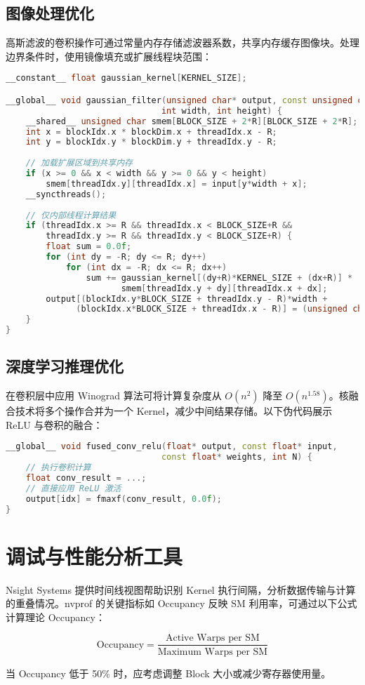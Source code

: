 \section{图像处理优化}
高斯滤波的卷积操作可通过常量内存存储滤波器系数，共享内存缓存图像块。处理边界条件时，使用镜像填充或扩展线程块范围：\par
\begin{lstlisting}[language=cpp]
__constant__ float gaussian_kernel[KERNEL_SIZE];

__global__ void gaussian_filter(unsigned char* output, const unsigned char* input, 
                               int width, int height) {
    __shared__ unsigned char smem[BLOCK_SIZE + 2*R][BLOCK_SIZE + 2*R];
    int x = blockIdx.x * blockDim.x + threadIdx.x - R;
    int y = blockIdx.y * blockDim.y + threadIdx.y - R;
    
    // 加载扩展区域到共享内存
    if (x >= 0 && x < width && y >= 0 && y < height)
        smem[threadIdx.y][threadIdx.x] = input[y*width + x];
    __syncthreads();
    
    // 仅内部线程计算结果
    if (threadIdx.x >= R && threadIdx.x < BLOCK_SIZE+R && 
        threadIdx.y >= R && threadIdx.y < BLOCK_SIZE+R) {
        float sum = 0.0f;
        for (int dy = -R; dy <= R; dy++)
            for (int dx = -R; dx <= R; dx++)
                sum += gaussian_kernel[(dy+R)*KERNEL_SIZE + (dx+R)] * 
                       smem[threadIdx.y + dy][threadIdx.x + dx];
        output[(blockIdx.y*BLOCK_SIZE + threadIdx.y - R)*width + 
              (blockIdx.x*BLOCK_SIZE + threadIdx.x - R)] = (unsigned char)sum;
    }
}
\end{lstlisting}
\section{深度学习推理优化}
在卷积层中应用 Winograd 算法可将计算复杂度从 $O(n^2)$ 降至 $O(n^{1.58})$。核融合技术将多个操作合并为一个 Kernel，减少中间结果存储。以下伪代码展示 ReLU 与卷积的融合：\par
\begin{lstlisting}[language=cpp]
__global__ void fused_conv_relu(float* output, const float* input, 
                               const float* weights, int N) {
    // 执行卷积计算
    float conv_result = ...;
    // 直接应用 ReLU 激活
    output[idx] = fmaxf(conv_result, 0.0f);
}
\end{lstlisting}
\chapter{调试与性能分析工具}
Nsight Systems 提供时间线视图帮助识别 Kernel 执行间隔，分析数据传输与计算的重叠情况。nvprof 的关键指标如 Occupancy 反映 SM 利用率，可通过以下公式计算理论 Occupancy：\par
$$ \text{Occupancy} = \frac{\text{Active Warps per SM}}{\text{Maximum Warps per SM}} $$\par
当 Occupancy 低于 50\%{} 时，应考虑调整 Block 大小或减少寄存器使用量。\par
